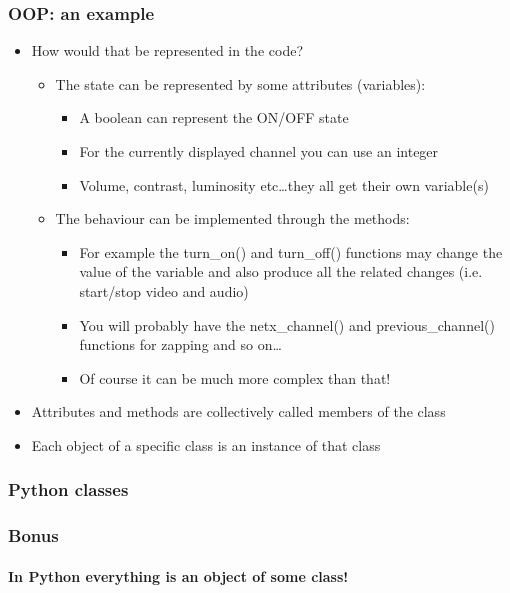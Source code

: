 \documentclass[9pt]{beamer}
\begin{document}
\begin{frame}
  \frametitle{OOP: an example}

  \begin{itemize}
    \item How would that be represented in the code?
    \smallskip
      \begin{itemize}
      \item The state can be represented by some \alert{attributes} (variables):
      \begin{itemize}
        \item A boolean can represent the ON/OFF state
        \item For the currently displayed channel you can use an integer
        \item Volume, contrast, luminosity etc\dots they all get their own variable(s)
      \end{itemize}

      \medskip

      \item The behaviour can be implemented through the \alert{methods}:
      \smallskip
      \begin{itemize}
        \item For example the turn\_on() and turn\_off() functions may change the value of the variable
              and also produce all the related changes (i.e. start/stop video and audio)
        \item You will probably have the netx\_channel() and previous\_channel() functions for zapping and so on\dots
        \item Of course it can be much more complex than that!
      \end{itemize}
    \end{itemize}

    \medskip

    \item Attributes and methods are collectively called \alert{members} of the class
    \medskip
    \item Each object of a specific class is an \alert{instance} of that class
  \end{itemize}

\end{frame}


\begin{frame}
  \frametitle{Python classes}
  
\end{frame}


\begin{frame}
  \frametitle{Bonus}
  \framesubtitle{In Python everything is an object of some class!}
  
\end{frame}
\end{document}
